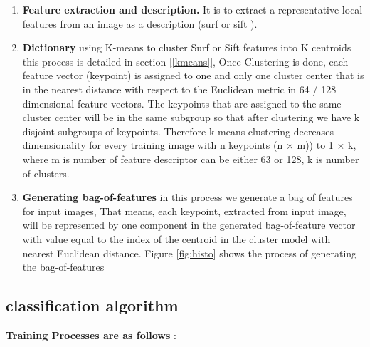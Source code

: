 \begin{enumerate}
\item \textbf{Feature extraction and description.} It is to extract a representative local features from an image as a description (surf or sift ).
\item \textbf{ Dictionary}
using K-means to cluster Surf or Sift features into K centroids this process is detailed in section [\ref{kmeans}],  Once Clustering is done, each feature vector (keypoint) is assigned to one and only one cluster center that is in the nearest distance with respect to the Euclidean metric in 64 / 128 dimensional feature vectors. The keypoints that are assigned to the same cluster center will be in the same subgroup so that after clustering we have k disjoint subgroups of keypoints. Therefore k-means clustering decreases dimensionality for every training image with n keypoints (n $\times$ m)) to 1 $\times$ k, where m is number of feature descriptor can be either 63 or 128, k is number of clusters.
\item \textbf{ Generating bag-of-features} in this process we generate a bag of features for input images, That means, each keypoint, extracted from input  image, will be represented by one component in the generated bag-of-feature vector with value equal to the index of the
centroid in the cluster model with nearest Euclidean distance. Figure \ref{fig:histo} shows the process of generating the bag-of-features 

\end{enumerate}


\subsection{classification algorithm }

\textbf{Training Processes are as follows }:


